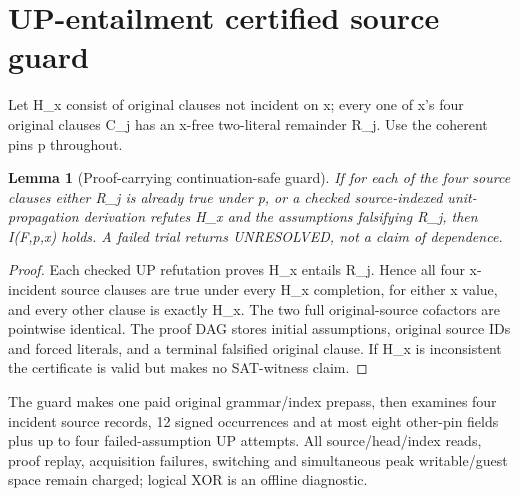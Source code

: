 \documentclass[11pt]{article}
\newtheorem{lemma}{Lemma}
\begin{document}
\section{UP-entailment certified source guard}
Let H_x consist of original clauses not incident on x; every one of x's four original clauses C_j has an x-free two-literal remainder R_j. Use the coherent pins p throughout.
\begin{lemma}[Proof-carrying continuation-safe guard]
If for each of the four source clauses either R_j is already true under p, or a checked source-indexed unit-propagation derivation refutes H_x and the assumptions falsifying R_j, then I(F,p,x) holds. A failed trial returns UNRESOLVED, not a claim of dependence.
\end{lemma}
\begin{proof}
Each checked UP refutation proves H_x entails R_j. Hence all four x-incident source clauses are true under every H_x completion, for either x value, and every other clause is exactly H_x. The two full original-source cofactors are pointwise identical. The proof DAG stores initial assumptions, original source IDs and forced literals, and a terminal falsified original clause. If H_x is inconsistent the certificate is valid but makes no SAT-witness claim. \end{proof}
The guard makes one paid original grammar/index prepass, then examines four incident source records, 12 signed occurrences and at most eight other-pin fields plus up to four failed-assumption UP attempts. All source/head/index reads, proof replay, acquisition failures, switching and simultaneous peak writable/guest space remain charged; logical XOR is an offline diagnostic.
\end{document}
